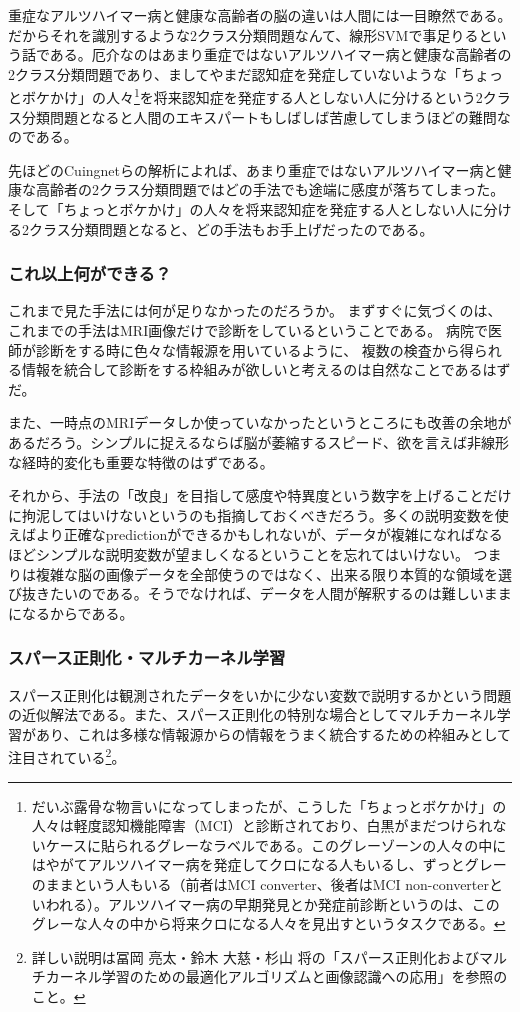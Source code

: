 重症なアルツハイマー病と健康な高齢者の脳の違いは人間には一目瞭然である。だからそれを識別するような2クラス分類問題なんて、線形SVMで事足りるという話である。厄介なのはあまり重症ではないアルツハイマー病と健康な高齢者の2クラス分類問題であり、ましてやまだ認知症を発症していないような「ちょっとボケかけ」の人々\footnote{だいぶ露骨な物言いになってしまったが、こうした「ちょっとボケかけ」の人々は軽度認知機能障害（MCI）と診断されており、白黒がまだつけられないケースに貼られるグレーなラベルである。このグレーゾーンの人々の中にはやがてアルツハイマー病を発症してクロになる人もいるし、ずっとグレーのままという人もいる（前者はMCI converter、後者はMCI non-converterといわれる）。アルツハイマー病の早期発見とか発症前診断というのは、このグレーな人々の中から将来クロになる人々を見出すというタスクである。}を将来認知症を発症する人としない人に分けるという2クラス分類問題となると人間のエキスパートもしばしば苦慮してしまうほどの難問なのである。

先ほどのCuingnetらの解析によれば、あまり重症ではないアルツハイマー病と健康な高齢者の2クラス分類問題ではどの手法でも途端に感度が落ちてしまった。そして「ちょっとボケかけ」の人々を将来認知症を発症する人としない人に分ける2クラス分類問題となると、どの手法もお手上げだったのである。

\subsubsection{これ以上何ができる？}
これまで見た手法には何が足りなかったのだろうか。
まずすぐに気づくのは、これまでの手法はMRI画像だけで診断をしているということである。
病院で医師が診断をする時に色々な情報源を用いているように、
複数の検査から得られる情報を統合して診断をする枠組みが欲しいと考えるのは自然なことであるはずだ。

また、一時点のMRIデータしか使っていなかったというところにも改善の余地があるだろう。シンプルに捉えるならば脳が萎縮するスピード、欲を言えば非線形な経時的変化も重要な特徴のはずである。

それから、手法の「改良」を目指して感度や特異度という数字を上げることだけに拘泥してはいけないというのも指摘しておくべきだろう。多くの説明変数を使えばより正確なpredictionができるかもしれないが、データが複雑になればなるほどシンプルな説明変数が望ましくなるということを忘れてはいけない。
つまりは複雑な脳の画像データを全部使うのではなく、出来る限り本質的な領域を選び抜きたいのである。そうでなければ、データを人間が解釈するのは難しいままになるからである。

\subsubsection{スパース正則化・マルチカーネル学習}
スパース正則化は観測されたデータをいかに少ない変数で説明するかという問題の近似解法である。また、スパース正則化の特別な場合としてマルチカーネル学習があり、これは多様な情報源からの情報をうまく統合するための枠組みとして注目されている\footnote{詳しい説明は冨岡 亮太・鈴木 大慈・杉山 将の「スパース正則化およびマルチカーネル学習のための最適化アルゴリズムと画像認識への応用」を参照のこと。}。

